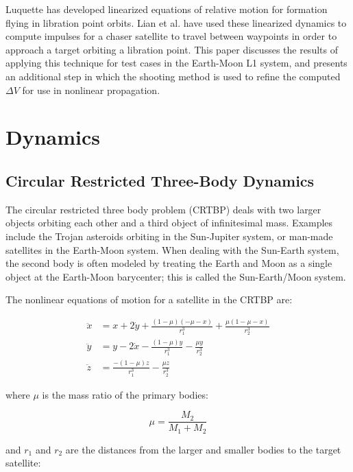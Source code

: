 \documentclass[a4paper]{article}
\begin{document}
Luquette \cite{luquette2004} has developed linearized equations of relative motion for formation flying in libration point orbits.  Lian et al. \cite{lian2011} have used these linearized dynamics to compute impulses for a chaser satellite to travel between waypoints in order to approach a target orbiting a libration point.  This paper discusses the results of applying this technique for test cases in the Earth-Moon L1 system, and presents an additional step in which the shooting method is used to refine the computed \(\Delta V\) for use in nonlinear propagation.

\section{Dynamics}

\subsection{Circular Restricted Three-Body Dynamics}
The circular restricted three body problem (CRTBP) deals with two larger objects orbiting each other and a third object of infinitesimal mass.  Examples include the Trojan asteroids orbiting in the Sun-Jupiter system, or man-made satellites in the Earth-Moon system.  When dealing with the Sun-Earth system, the second body is often modeled by treating the Earth and Moon as a single object at the Earth-Moon barycenter; this is called the Sun-Earth/Moon system.

The nonlinear equations of motion for a satellite in the CRTBP are:

\begin{equation} \label{eq:CRTBP}
\begin{aligned}
\ddot{x} &= x + 2\dot{y} + \frac{(1 - \mu)(-\mu - x)}{r_1^3} + \frac{\mu(1 - \mu - x)}{r_2^3} \\
\ddot{y} &= y - 2\dot{x} - \frac{(1 - \mu)y}{r_1^3} - \frac{\mu y}{r_2^3} \\
\ddot{z} &= \frac{-(1 - \mu)z}{r_1^3} - \frac{\mu z}{r_2^3}
\end{aligned}
\end{equation}

where \(\mu\) is the mass ratio of the primary bodies:

\begin{equation*}
\mu = \frac{M_2}{M_1 + M_2}
\end{equation*}

and \(r_1\) and \(r_2\) are the distances from the larger and smaller bodies to the target satellite:
\end{document}
